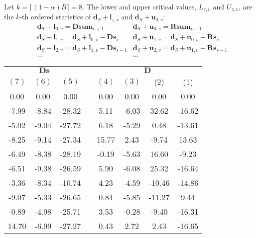 \documentclass[11pt,a4paper,openright,twoside]{article}
\begin{document}
Let $k=\lceil (1-\alpha) B\rceil =8$. The lower and upper critical values, $L_{z,v}$ and $U_{z,v}$, are the $k$-th ordered statistics of $\mathbf{d}_S +\mathbf{l}_{z,v}$ and $\mathbf{d}_S + \mathbf{u}_{0,v}$:
\begin{align*}
& \mathbf{d}_S +\mathbf{l}_{0,v}=\mathbf{Dsum}_{v+1} & \mathbf{d}_S + \mathbf{u}_{0,v}=\mathbf{Rsum}_{v+1} \\
& \mathbf{d}_S + \mathbf{l}_{1,v}=\mathbf{d}_S + \mathbf{l}_{0,v} - \mathbf{Ds}_{s} & \mathbf{d}_S + \mathbf{u}_{1,v}=\mathbf{d}_S + \mathbf{u}_{0,v} - \mathbf{Rs}_{s}\\
& \mathbf{d}_S + \mathbf{l}_{2,v}=\mathbf{d}_S + \mathbf{l}_{1,v} - \mathbf{Ds}_{s-1} & \mathbf{d}_S + \mathbf{u}_{2,v}=\mathbf{d}_S + \mathbf{u}_{1,v} - \mathbf{Rs}_{s-1}\\
& \ldots & \ldots
\end{align*}


\newpage

\begin{table}[h!]
\centering
\begin{tabular}{cccccccc}
\multicolumn{3}{c}{$\mathbf{Ds}$} & & \multicolumn{4}{c}{$\mathbf{D}$}\\
$(7)$ & $(6)$ & $(5)$ & & $(4)$ & $(3)$ & (2) & (1) \\
\cline{1-3} \cline{5-8}
0.00 & 0.00 & 0.00 &  & 0.00 & 0.00 & 0.00 & 0.00\\
-7.99 & -8.84 & -28.32 &  & 5.11 & -6.03 & 32.62 & -16.62\\
-5.02 & -9.04 & -27.72 &  & 6.18 & -5.29 & 0.48 & -13.61\\
-8.25 & -9.14 & -27.34 &  & 15.77 & 2.43 & -9.74 & 13.63\\
-6.49 & -8.38 & -28.19 &  & -0.19 & -5.63 & 16.60 & -9.23\\
-6.51 & -9.38 & -26.59 &  & 5.90 & -6.08 & 25.32 & -16.64\\
-3.36 & -8.34 & -10.74 &  & 4.23 & -4.59 & -10.46 & -14.86\\
-9.07 & -5.33 & -26.65 &  & 0.84 & -5.85 & -11.27 & 9.44\\
-0.89 & -4.98 & -25.71 &  & 3.53 & -0.28 & -9.40 & -16.31\\
14.70 & -6.99 & -27.27 &  & 0.43 & 2.72 & 2.43 & -16.65\\
\end{tabular}
\end{table}
\end{document}
